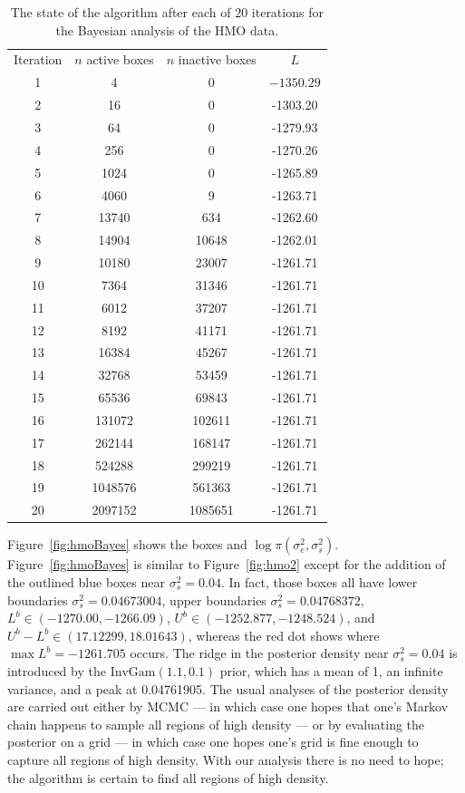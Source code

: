 \documentclass{report}
\newcommand{\IG}{\text{InvGam}}
\newcommand{\sigssq}{\sigma_s^2}
\newcommand{\sigesq}{\sigma_e^2}
\begin{document}
\begin{table}[H]
\centering
\begin{tabular}{|c|c|c|c|}
\hline
Iteration & $n$ active boxes & $n$ inactive boxes & $L$\\
1 & 4 & 0 & $-1350.29$\\
2 & 16 & 0 & -1303.20\\
3 & 64 & 0 & -1279.93\\
4 & 256 & 0 & -1270.26\\
5 & 1024 & 0 & -1265.89\\
6 & 4060 & 9 & -1263.71\\
7 & 13740 & 634 & -1262.60\\
8 & 14904 & 10648 & -1262.01\\
9 & 10180 & 23007 & -1261.71\\
10 & 7364 & 31346 & -1261.71\\
11 & 6012 & 37207 & -1261.71\\
12 & 8192 & 41171 & -1261.71\\
13 & 16384 & 45267 & -1261.71\\
14 & 32768 & 53459 & -1261.71\\
15 & 65536 & 69843 & -1261.71\\
16 & 131072 & 102611 & -1261.71\\
17 & 262144 & 168147 & -1261.71\\
18 & 524288 & 299219 & -1261.71\\
19 & 1048576 & 561363 & -1261.71\\
20 & 2097152 & 1085651 & -1261.71\\
\hline
\end{tabular}
\caption{The state of the algorithm after each of 20 iterations for the Bayesian analysis of the HMO data.}
\label{table:hmo_HH11Bayes}
\end{table}

Figure~\ref{fig:hmoBayes} shows the boxes and $\log \pi(\sigesq,\sigssq)$.  Figure~\ref{fig:hmoBayes} is similar to Figure~\ref{fig:hmo2} except for the addition of the outlined blue boxes near $\sigssq = 0.04$.  In fact, those boxes all have lower boundaries $\sigssq = 0.04673004$, upper boundaries $\sigssq = 0.04768372$, $L^b \in (-1270.00, -1266.09)$, $U^b \in (-1252.877, -1248.524)$, and $U^b-L^b \in (17.12299, 18.01643)$, whereas the red dot shows where $\max L^b = -1261.705$ occurs.  The ridge in the posterior density near $\sigssq = 0.04$ is introduced by the $\IG(1.1,0.1)$ prior, which has a mean of 1, an infinite variance, and a peak at 0.04761905.  The usual analyses of the posterior density are carried out either by MCMC --- in which case one hopes that one's Markov chain happens to sample all regions of high density --- or by evaluating the posterior on a grid --- in which case one hopes one's grid is fine enough to capture all regions of high density.  With our analysis there is no need to hope; the algorithm is certain to find all regions of high density.
\end{document}
